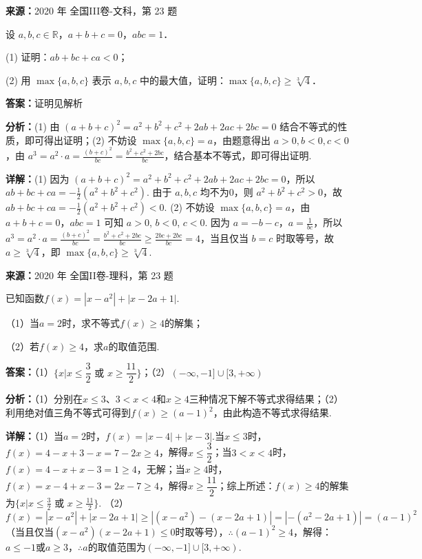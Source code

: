 \begin{question}[points=10]
\textbf{来源：}2020 年 全国III卷-文科，第 23 题\par
[选修4-5：不等式选讲]

设 $a,b,c\in\mathbb R$，$a+b+c=0$，$abc=1$．

(1) 证明：$ab+bc+ca<0$；

(2) 用 $\max\{a,b,c\}$ 表示 $a,b,c$ 中的最大值，证明：$\max\{a,b,c\}\geq\sqrt[3]{4}$．
\begin{solution}
\textbf{答案：}证明见解析

\textbf{分析：}(1) 由 $(a+b+c)^2=a^2+b^2+c^2+2ab+2ac+2bc=0$ 结合不等式的性质，即可得出证明；(2) 不妨设 $\max\{a,b,c\}=a$，由题意得出 $a>0,b<0,c<0$，由 $a^3=a^2\cdot a=\frac{(b+c)^2}{bc}=\frac{b^2+c^2+2bc}{bc}$，结合基本不等式，即可得出证明.

\textbf{详解：}(1) 因为 $(a+b+c)^2=a^2+b^2+c^2+2ab+2ac+2bc=0$，所以 $ab+bc+ca=-\frac{1}{2}(a^2+b^2+c^2)$. 由于 $a,b,c$ 均不为0，则 $a^2+b^2+c^2>0$，故 $ab+bc+ca=-\frac{1}{2}(a^2+b^2+c^2)<0$.
(2) 不妨设 $\max\{a,b,c\}=a$，由 $a+b+c=0$，$abc=1$ 可知 $a>0$, $b<0$, $c<0$. 因为 $a=-b-c$，$a=\frac{1}{bc}$，所以 $a^3=a^2\cdot a=\frac{(b+c)^2}{bc}=\frac{b^2+c^2+2bc}{bc}\geq\frac{2bc+2bc}{bc}=4$，当且仅当 $b=c$ 时取等号，故 $a\geq\sqrt[3]{4}$，即 $\max\{a,b,c\}\geq\sqrt[3]{4}$.
\end{solution}
\end{question}

\begin{question}[points=10]
\textbf{来源：}2020 年 全国II卷-理科，第 23 题\par
已知函数$f(x)=|x-a^2|+|x-2a+1|$.

（1）当$a=2$时，求不等式$f(x)\ge4$的解集；

（2）若$f(x)\ge4$，求$a$的取值范围.
\begin{solution}
\textbf{答案：}（1）$\{x|x\le\dfrac32\text{ 或 }x\ge\dfrac{11}{2}\}$；（2）$(-\infty,-1]\cup[3,+\infty)$

\textbf{分析：}（1）分别在$x\le3$、$3<x<4$和$x\ge4$三种情况下解不等式求得结果；（2）利用绝对值三角不等式可得到$f(x)\ge(a-1)^2$，由此构造不等式求得结果.

\textbf{详解：}（1）当$a=2$时，$f(x)=|x-4|+|x-3|$.当$x\le3$时，$f(x)=4-x+3-x=7-2x\ge4$，解得$x\le\dfrac32$；当$3<x<4$时，$f(x)=4-x+x-3=1\ge4$，无解；当$x\ge4$时，$f(x)=x-4+x-3=2x-7\ge4$，解得$x\ge\dfrac{11}{2}$；综上所述：$f(x)\ge4$的解集为$\{x|x\le\frac32\text{ 或 }x\ge\frac{11}{2}\}$.
（2）$f(x)=|x-a^2|+|x-2a+1|\geq|(x-a^2)-(x-2a+1)|=|-(a^2-2a+1)|=(a-1)^2$（当且仅当$(x-a^2)(x-2a+1)\leq0$时取等号），$\therefore(a-1)^2\ge4$，解得：$a\le-1$或$a\ge3$，$\therefore a$的取值范围为$(-\infty,-1]\cup[3,+\infty)$.
\end{solution}
\end{question}

